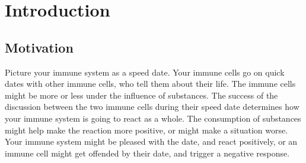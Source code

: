 \documentclass{l4proj}
\begin{document}
%
%
%
%
%
%
%
%
\chapter{Introduction}


\section{Motivation}

Picture your immune system as a speed date. Your immune cells go on quick dates with other immune cells, who tell them about their life. The immune cells might be more or less under the influence of substances. The success of the discussion between the two immune cells during their speed date determines how your immune system is going to react as a whole. The consumption of substances might help make the reaction more positive, or might make a situation worse. Your immune system might be pleased with the date, and react positively, or an immune cell might get offended by their date, and trigger a negative response. %
\end{document}

